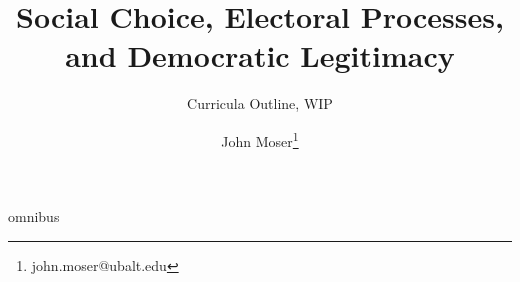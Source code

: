 \documentclass[twoside,titlepage,12pt,appendixprefix=true]{scrreprt}
\begin{document}
    \author{John Moser\thanks{john.moser@ubalt.edu}}

    \title{Social Choice, Electoral Processes, and Democratic Legitimacy}
    \subtitle{Curricula Outline, WIP}

    \tableofcontents
    
    \printbibliography
    {omnibus}
\end{document}
